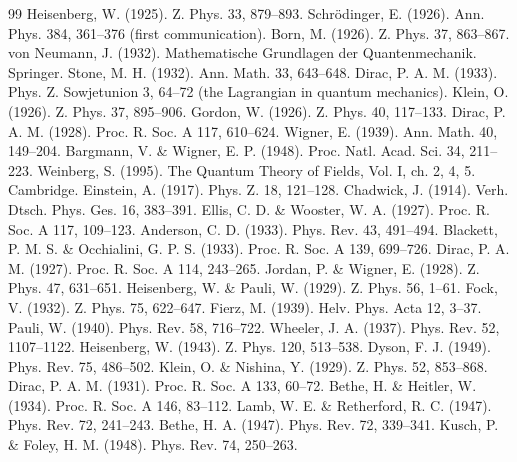 \begin{thebibliography}{99}
 Heisenberg, W. (1925). Z. Phys. 33, 879–893.
 Schrödinger, E. (1926). Ann. Phys. 384, 361–376 (first communication).
 Born, M. (1926). Z. Phys. 37, 863–867.
 von Neumann, J. (1932). Mathematische Grundlagen der Quantenmechanik. Springer.
 Stone, M. H. (1932). Ann. Math. 33, 643–648.
 Dirac, P. A. M. (1933). Phys. Z. Sowjetunion 3, 64–72 (the Lagrangian in quantum mechanics).
 Klein, O. (1926). Z. Phys. 37, 895–906.
 Gordon, W. (1926). Z. Phys. 40, 117–133.
 Dirac, P. A. M. (1928). Proc. R. Soc. A 117, 610–624.
 Wigner, E. (1939). Ann. Math. 40, 149–204.
 Bargmann, V. \& Wigner, E. P. (1948). Proc. Natl. Acad. Sci. 34, 211–223.
 Weinberg, S. (1995). The Quantum Theory of Fields, Vol. I, ch. 2, 4, 5. Cambridge.
 Einstein, A. (1917). Phys. Z. 18, 121–128.
 Chadwick, J. (1914). Verh. Dtsch. Phys. Ges. 16, 383–391.
 Ellis, C. D. \& Wooster, W. A. (1927). Proc. R. Soc. A 117, 109–123.
 Anderson, C. D. (1933). Phys. Rev. 43, 491–494.
 Blackett, P. M. S. \& Occhialini, G. P. S. (1933). Proc. R. Soc. A 139, 699–726.
 Dirac, P. A. M. (1927). Proc. R. Soc. A 114, 243–265.
 Jordan, P. \& Wigner, E. (1928). Z. Phys. 47, 631–651.
 Heisenberg, W. \& Pauli, W. (1929). Z. Phys. 56, 1–61.
 Fock, V. (1932). Z. Phys. 75, 622–647.
 Fierz, M. (1939). Helv. Phys. Acta 12, 3–37.
 Pauli, W. (1940). Phys. Rev. 58, 716–722.
 Wheeler, J. A. (1937). Phys. Rev. 52, 1107–1122.
 Heisenberg, W. (1943). Z. Phys. 120, 513–538.
 Dyson, F. J. (1949). Phys. Rev. 75, 486–502.
 Klein, O. \& Nishina, Y. (1929). Z. Phys. 52, 853–868.
 Dirac, P. A. M. (1931). Proc. R. Soc. A 133, 60–72.
 Bethe, H. \& Heitler, W. (1934). Proc. R. Soc. A 146, 83–112.
 Lamb, W. E. \& Retherford, R. C. (1947). Phys. Rev. 72, 241–243.
 Bethe, H. A. (1947). Phys. Rev. 72, 339–341.
 Kusch, P. \& Foley, H. M. (1948). Phys. Rev. 74, 250–263.

\end{thebibliography}

